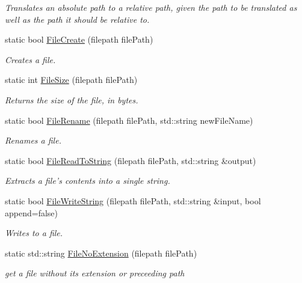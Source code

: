 \begin{DoxyCompactItemize}
\begin{DoxyCompactList}\small\item\em Translates an absolute path to a relative path, given the path to be translated as well as the path it should be relative to. \end{DoxyCompactList}\item 
static bool \hyperlink{classDCEngine_1_1FileSystem_acd990ef22480adf5f8492b906ae8e66a}{File\-Create} (filepath file\-Path)
\begin{DoxyCompactList}\small\item\em Creates a file. \end{DoxyCompactList}\item 
static int \hyperlink{classDCEngine_1_1FileSystem_a4b1e6554579c7fa6d1183489bf075734}{File\-Size} (filepath file\-Path)
\begin{DoxyCompactList}\small\item\em Returns the size of the file, in bytes. \end{DoxyCompactList}\item 
static bool \hyperlink{classDCEngine_1_1FileSystem_a07a72d17a10c817af65c84e54e3fa142}{File\-Rename} (filepath file\-Path, std\-::string new\-File\-Name)
\begin{DoxyCompactList}\small\item\em Renames a file. \end{DoxyCompactList}\item 
static bool \hyperlink{classDCEngine_1_1FileSystem_a3ca3e32fc7d6e58d2acb74ba566fe60c}{File\-Read\-To\-String} (filepath file\-Path, std\-::string \&output)
\begin{DoxyCompactList}\small\item\em Extracts a file's contents into a single string. \end{DoxyCompactList}\item 
static bool \hyperlink{classDCEngine_1_1FileSystem_aaeb997a6b160141b00551e5f2be0ca77}{File\-Write\-String} (filepath file\-Path, std\-::string \&input, bool append=false)
\begin{DoxyCompactList}\small\item\em Writes to a file. \end{DoxyCompactList}\item 
static std\-::string \hyperlink{classDCEngine_1_1FileSystem_a1b32740b97d9c01b41390a59b698a38a}{File\-No\-Extension} (filepath file\-Path)
\begin{DoxyCompactList}\small\item\em get a file without its extension or preceeding path \end{DoxyCompactList}\item 

\end{DoxyCompactItemize}
